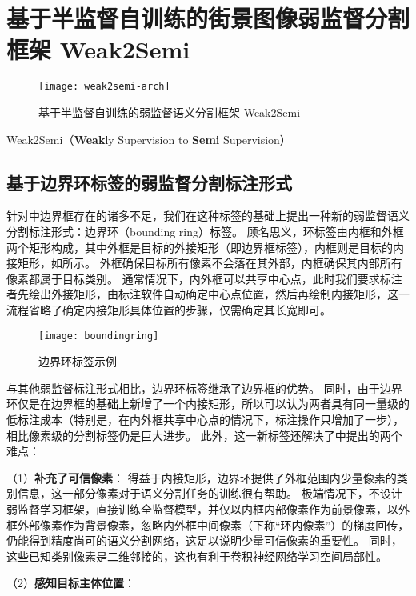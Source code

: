 \section{基于半监督自训练的街景图像弱监督分割框架 Weak2Semi}
\begin{figure}[h]
\centering
\texttt{[image: weak2semi-arch]}
\caption{基于半监督自训练的弱监督语义分割框架 Weak2Semi}
\label{fig:weak2semi-arch}
\end{figure}
Weak2Semi（\textbf{Weak}ly Supervision to \textbf{Semi} Supervision）
\subsection{基于边界环标签的弱监督分割标注形式}
\label{subsec:boundingring}
针对中边界框存在的诸多不足，我们在这种标签的基础上提出一种新的弱监督语义分割标注形式：边界环（bounding ring）标签。
顾名思义，环标签由内框和外框两个矩形构成，其中外框是目标的外接矩形（即边界框标签），内框则是目标的内接矩形，如所示。
外框确保目标所有像素不会落在其外部，内框确保其内部所有像素都属于目标类别。
通常情况下，内外框可以共享中心点，此时我们要求标注者先绘出外接矩形，由标注软件自动确定中心点位置，然后再绘制内接矩形，这一流程省略了确定内接矩形具体位置的步骤，仅需确定其长宽即可。
\begin{figure}[h]
\centering
\texttt{[image: boundingring]}
\caption{边界环标签示例}
\label{fig:boundingring}
\end{figure}
\par
与其他弱监督标注形式相比，边界环标签继承了边界框的优势。
同时，由于边界环仅是在边界框的基础上新增了一个内接矩形，所以可以认为两者具有同一量级的低标注成本（特别是，在内外框共享中心点的情况下，标注操作只增加了一步），相比像素级的分割标签仍是巨大进步。
此外，这一新标签还解决了中提出的两个难点：
\par
（1）\textbf{补充了可信像素}：
得益于内接矩形，边界环提供了外框范围内少量像素的类别信息，这一部分像素对于语义分割任务的训练很有帮助。
极端情况下，不设计弱监督学习框架，直接训练全监督模型，并仅以内框内部像素作为前景像素，以外框外部像素作为背景像素，忽略内外框中间像素（下称“环内像素”）的梯度回传，仍能得到精度尚可的语义分割网络，这足以说明少量可信像素的重要性。
同时，这些已知类别像素是二维邻接的，这也有利于卷积神经网络学习空间局部性。
\par
（2）\textbf{感知目标主体位置}：
